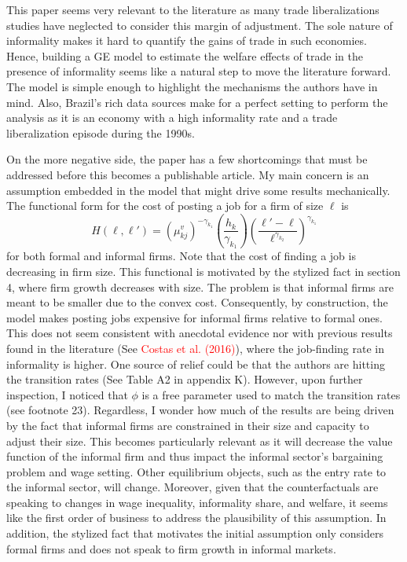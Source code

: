 \documentclass[12pt,oneside,reqno]{amsart}
\begin{document}
This paper seems very relevant to the literature as many trade liberalizations studies have neglected to consider this margin of adjustment. The sole nature of informality makes it hard to quantify the gains of trade in such economies. Hence, building a GE model to estimate the welfare effects of trade in the presence of informality seems like a natural step to move the literature forward. The model is simple enough to highlight the mechanisms the authors have in mind. Also, Brazil's rich data sources make for a perfect setting to perform the analysis as it is an economy with a high informality rate and a trade liberalization episode during the 1990s. 

On the more negative side, the paper has a few shortcomings that must be addressed before this becomes a publishable article. My main concern is an assumption embedded in the model that might drive some results mechanically. The functional form for the cost of posting a job for a firm of size $\ell$ is 
\begin{equation*}
    H(\ell,\ell') = \left(\mu_{kj}^v\right)^{-\gamma_{k_1}}\left(\frac{h_k}{\gamma_{k_1}}\right)\left(\frac{\ell'-\ell}{\ell^{\gamma_{k_2}}}\right)^{\gamma_{k_1}}
\end{equation*}
for both formal and informal firms. Note that the cost of finding a job is decreasing in firm size. This functional is motivated by the stylized fact in section 4, where firm growth decreases with size. The problem is that informal firms are meant to be smaller due to the convex cost. Consequently, by construction, the model makes posting jobs expensive for informal firms relative to formal ones. This does not seem consistent with anecdotal evidence nor with previous results found in the literature (See \textcolor{red}{Costas et al. (2016)}), where the job-finding rate in informality is higher. One source of relief could be that the authors are hitting the transition rates (See Table A2 in appendix K). However, upon further inspection, I noticed that $\phi$ is a free parameter used to match the transition rates (see footnote 23). Regardless, I wonder how much of the results are being driven by the fact that informal firms are constrained in their size and capacity to adjust their size. This becomes particularly relevant as it will decrease the value function of the informal firm and thus impact the informal sector's bargaining problem and wage setting. Other equilibrium objects, such as the entry rate to the informal sector, will change. Moreover, given that the counterfactuals are speaking to changes in wage inequality, informality share,  and welfare, it seems like the first order of business to address the plausibility of this assumption. In addition, the stylized fact that motivates the initial assumption only considers formal firms and does not speak to firm growth in informal markets. 
\end{document}
